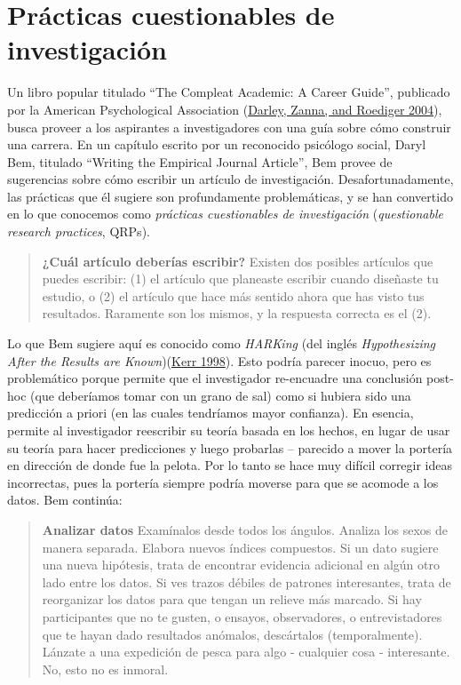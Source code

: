\documentclass[
  12pt,
]{book}
\begin{document}
\hypertarget{pruxe1cticas-cuestionables-de-investigaciuxf3n}{%
\section{Prácticas cuestionables de investigación}\label{pruxe1cticas-cuestionables-de-investigaciuxf3n}}

Un libro popular titulado ``The Compleat Academic: A Career Guide'', publicado por la American Psychological Association (\protect\hyperlink{ref-darl:zann:roed:2004}{Darley, Zanna, and Roediger 2004}), busca proveer a los aspirantes a investigadores con una guía sobre cómo construir una carrera. En un capítulo escrito por un reconocido psicólogo social, Daryl Bem, titulado ``Writing the Empirical Journal Article'', Bem provee de sugerencias sobre cómo escribir un artículo de investigación. Desafortunadamente, las prácticas que él sugiere son profundamente problemáticas, y se han convertido en lo que conocemos como \emph{prácticas cuestionables de investigación} (\emph{questionable research practices}, QRPs).

\begin{quote}
\textbf{¿Cuál artículo deberías escribir?} Existen dos posibles artículos que puedes escribir: (1) el artículo que planeaste escribir cuando diseñaste tu estudio, o (2) el artículo que hace más sentido ahora que has visto tus resultados. Raramente son los mismos, y la respuesta correcta es el (2).
\end{quote}

Lo que Bem sugiere aquí es conocido como \emph{HARKing} (del inglés \emph{Hypothesizing After the Results are Known})(\protect\hyperlink{ref-kerr:1998}{Kerr 1998}). Esto podría parecer inocuo, pero es problemático porque permite que el investigador re-encuadre una conclusión post-hoc (que deberíamos tomar con un grano de sal) como si hubiera sido una predicción a priori (en las cuales tendríamos mayor confianza). En esencia, permite al investigador reescribir su teoría basada en los hechos, en lugar de usar su teoría para hacer predicciones y luego probarlas -- parecido a mover la portería en dirección de donde fue la pelota. Por lo tanto se hace muy difícil corregir ideas incorrectas, pues la portería siempre podría moverse para que se acomode a los datos. Bem continúa:

\begin{quote}
\textbf{Analizar datos} Examínalos desde todos los ángulos. Analiza los sexos de manera separada. Elabora nuevos índices compuestos. Si un dato sugiere una nueva hipótesis, trata de encontrar evidencia adicional en algún otro lado entre los datos. Si ves trazos débiles de patrones interesantes, trata de reorganizar los datos para que tengan un relieve más marcado. Si hay participantes que no te gusten, o ensayos, observadores, o entrevistadores que te hayan dado resultados anómalos, descártalos (temporalmente). Lánzate a una expedición de pesca para algo - cualquier cosa - interesante. No, esto no es inmoral.
\end{quote}
\end{document}
